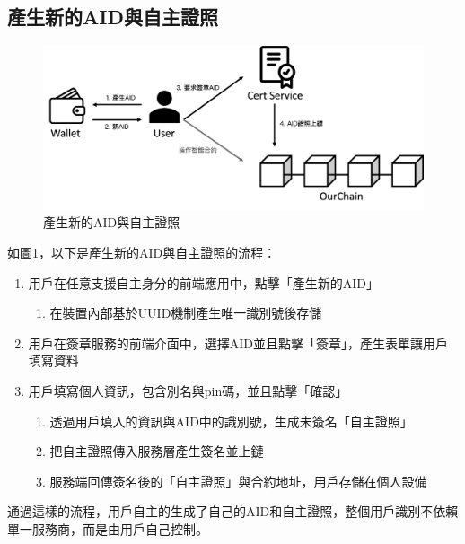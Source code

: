 \subsection{產生新的AID與自主證照}
\begin{figure}
  \centering
  \includegraphics[width=\linewidth, keepaspectratio]{figures/implement-1.png}
  \caption{產生新的AID與自主證照}
  \label{fig:implement-1}
\end{figure}
如圖\ref{fig:implement-1}，以下是產生新的AID與自主證照的流程：
\begin{enumerate}
  \item 用戶在任意支援自主身分的前端應用中，點擊「產生新的AID」
        \begin{enumerate}
          \item 在裝置內部基於UUID機制產生唯一識別號後存儲
        \end{enumerate}
  \item 用戶在簽章服務的前端介面中，選擇AID並且點擊「簽章」，產生表單讓用戶填寫資料
  \item 用戶填寫個人資訊，包含別名與pin碼，並且點擊「確認」
        \begin{enumerate}
          \item 透過用戶填入的資訊與AID中的識別號，生成未簽名「自主證照」
          \item 把自主證照傳入服務層產生簽名並上鏈
          \item 服務端回傳簽名後的「自主證照」與合約地址，用戶存儲在個人設備
        \end{enumerate}
\end{enumerate}
通過這樣的流程，用戶自主的生成了自己的AID和自主證照，整個用戶識別不依賴單一服務商，而是由用戶自己控制。
